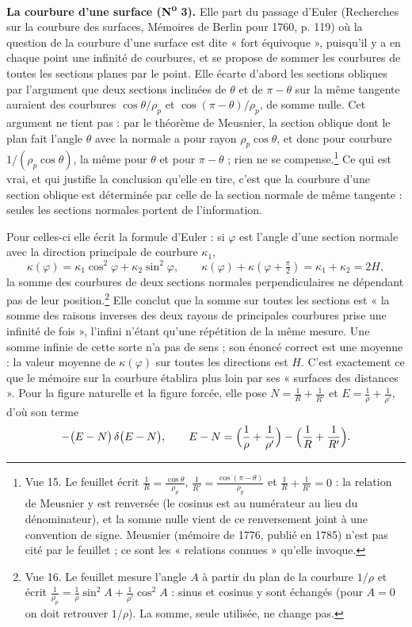 \documentclass[11pt,a4paper]{article}
\begin{document}
\textbf{La courbure d'une surface (N\textsuperscript{o} 3).} Elle part du
passage d'Euler (Recherches sur la courbure des surfaces, Mémoires de Berlin
pour 1760, p. 119) où la question de la courbure d'une surface est dite « fort
équivoque », puisqu'il y a en chaque point une infinité de courbures, et se
propose de sommer les courbures de toutes les sections planes par le point. Elle
écarte d'abord les sections obliques par l'argument que deux sections inclinées
de $\theta$ et de $\pi - \theta$ sur la même tangente auraient des courbures
$\cos\theta/\rho_p$ et $\cos(\pi-\theta)/\rho_p$, de somme nulle. Cet argument
ne tient pas : par le théorème de Meusnier, la section oblique dont le plan
fait l'angle $\theta$ avec la normale a pour rayon $\rho_p\cos\theta$, et donc
pour courbure $1/(\rho_p\cos\theta)$, la même pour $\theta$ et pour
$\pi-\theta$ ; rien ne se compense.\footnote{Vue 15. Le feuillet écrit
$\frac{1}{R} = \frac{\cos\theta}{\rho_p}$, $\frac{1}{R'} =
\frac{\cos(\pi-\theta)}{\rho_p}$ et $\frac1R + \frac1{R'} = 0$ : la relation de
Meusnier y est renversée (le cosinus est au numérateur au lieu du
dénominateur), et la somme nulle vient de ce renversement joint à une
convention de signe. Meusnier (mémoire de 1776, publié en 1785) n'est pas cité
par le feuillet ; ce sont les « relations connues » qu'elle invoque.} Ce qui
est vrai, et qui justifie la conclusion qu'elle en tire, c'est que la courbure
d'une section oblique est déterminée par celle de la section normale de même
tangente : seules les sections normales portent de l'information.

Pour celles-ci elle écrit la formule d'Euler : si $\varphi$ est l'angle d'une
section normale avec la direction principale de courbure $\kappa_1$,
\[
\kappa(\varphi) = \kappa_1\cos^2\varphi + \kappa_2\sin^2\varphi ,
\qquad
\kappa(\varphi) + \kappa\!\left(\varphi + \tfrac{\pi}{2}\right) = \kappa_1 +
\kappa_2 = 2H ,
\]
la somme des courbures de deux sections normales perpendiculaires ne dépendant
pas de leur position.\footnote{Vue 16. Le feuillet mesure l'angle $A$ à partir
du plan de la courbure $1/\rho$ et écrit $\frac{1}{\rho_p} =
\frac{1}{\rho}\sin^2 A + \frac{1}{\rho'}\cos^2 A$ : sinus et cosinus y sont
échangés (pour $A = 0$ on doit retrouver $1/\rho$). La somme, seule utilisée, ne
change pas.} Elle conclut que la somme sur toutes les sections est « la somme
des raisons inverses des deux rayons de principales courbures prise une
infinité de fois », l'infini n'étant qu'une répétition de la même mesure. Une
somme infinie de cette sorte n'a pas de sens ; son énoncé correct est une
moyenne : la valeur moyenne de $\kappa(\varphi)$ sur toutes les directions est
$H$. C'est exactement ce que le mémoire sur la courbure établira plus loin par
ses « surfaces des distances ». Pour la figure naturelle et la figure forcée,
elle pose $N = \frac1R + \frac1{R'}$ et $E = \frac1\rho + \frac1{\rho'}$, d'où
son terme
\[
-\bigl(E - N\bigr)\,\delta\bigl(E - N\bigr),
\qquad E - N = \Bigl(\frac1\rho + \frac1{\rho'}\Bigr) - \Bigl(\frac1R +
\frac1{R'}\Bigr).
\]
\end{document}
